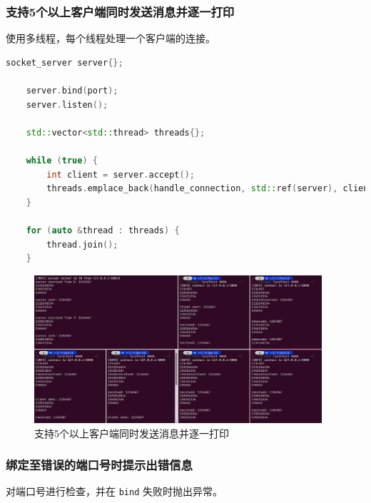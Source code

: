 \documentclass{article}
\begin{document}
\subsubsection{支持5个以上客户端同时发送消息并逐一打印}

使用多线程，每个线程处理一个客户端的连接。

\begin{lstlisting}[language=C++]
    socket_server server{};

    server.bind(port);
    server.listen();

    std::vector<std::thread> threads{};

    while (true) {
        int client = server.accept();
        threads.emplace_back(handle_connection, std::ref(server), client);
    }

    for (auto &thread : threads) {
        thread.join();
    }
\end{lstlisting}

\begin{figure}[H]
    \centering
    \includegraphics[width=0.95\textwidth]{img/2.png}
    \caption{支持5个以上客户端同时发送消息并逐一打印}
\end{figure}

\subsubsection{绑定至错误的端口号时提示出错信息}

对端口号进行检查，并在 \texttt{bind} 失败时抛出异常。
\end{document}
